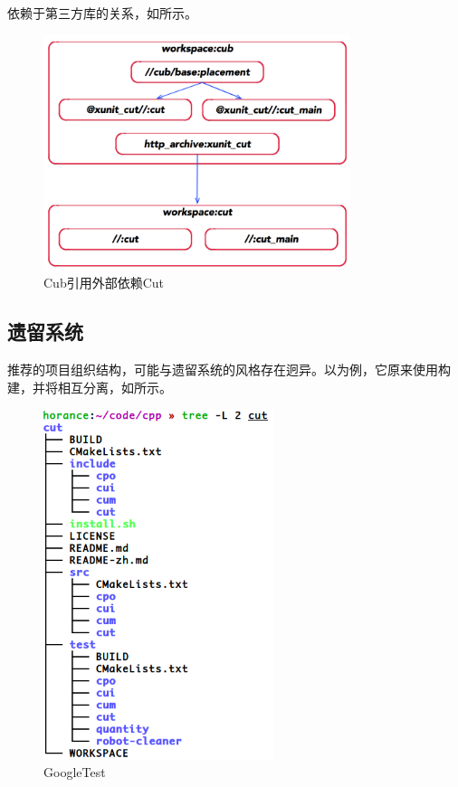 \begin{content}
依赖于第三方库的关系，如所示。

\begin{figure}
\centering
\includegraphics[width=0.8\textwidth]{figures/bazel-concept-cub-deps-cut.png}
\caption{Cub引用外部依赖Cut}
 \label{fig:bazel-concept-cub-deps-cut}
\end{figure}

\subsection{遗留系统}

推荐的项目组织结构，可能与遗留系统的风格存在迥异。以为例，它原来使用构建，并将相互分离，如所示。

\begin{figure}[H]
\centering
\includegraphics[width=0.6\textwidth]{figures/bazel-concept-cut.png}
\caption{GoogleTest}
 \label{fig:bazel-concept-cut}
\end{figure}


\end{content}
